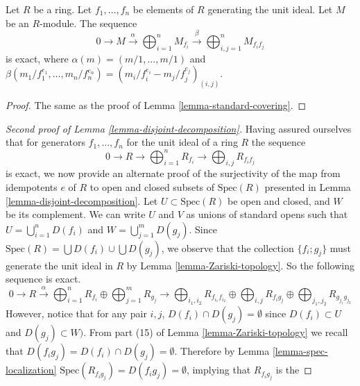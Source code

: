 \begin{lemma}
\label{lemma-cover-module}
Let $R$ be a ring. Let $f_1, \ldots, f_n$ be elements of $R$
generating the unit ideal. Let $M$ be an $R$-module.
The sequence
$$
0 \to
M \xrightarrow{\alpha}
\bigoplus\nolimits_{i = 1}^n M_{f_i} \xrightarrow{\beta}
\bigoplus\nolimits_{i, j = 1}^n M_{f_i f_j}
$$
is exact, where $\alpha(m) = (m/1, \ldots, m/1)$
and $\beta(m_1/f_1^{e_1}, \ldots, m_n/f_n^{e_n})
= (m_i/f_i^{e_i} - m_j/f_j^{e_j})_{(i, j)}$.
\end{lemma}

\begin{proof}
The same as the proof of Lemma \ref{lemma-standard-covering}.
\end{proof}

\begin{proof}[Second proof of Lemma \ref{lemma-disjoint-decomposition}]
Having assured ourselves that for generators ${f_1, \ldots, f_n}$ for the unit
ideal of a ring $R$ the sequence
$$
0 \rightarrow R
\rightarrow \bigoplus\nolimits_{i = 1}^ {n} R_{f_{i}}
\rightarrow \bigoplus\nolimits_{i, j} R_{f_{i}f_{j}}
$$
is exact, we now provide an alternate proof of the surjectivity of
the map from idempotents $e$ of $R$ to open and closed subsets of
$\text{Spec}(R)$
presented in Lemma \ref{lemma-disjoint-decomposition}.
Let $U \subset \text{Spec}(R)$ be open and closed, and $W$ be its
complement. We can
write $U$ and $V$ as unions of standard opens such that
$U = \bigcup_{i = 1}^{n}  D(f_i)$ and
$W = \bigcup_{j = 1}^{m} D(g_j)$.  Since
$\text{Spec}(R) = \bigcup D(f_i) \cup \bigcup D(g_j)$,
we observe that the collection $\{ f_i;g_j\}$ must
generate the unit ideal in $R$ by Lemma \ref{lemma-Zariski-topology}.
So the following sequence is exact.
\begin{equation}
\label{equation-idempotent-exact-sequence}
0 \rightarrow R \stackrel{\alpha}{\rightarrow}
\bigoplus\nolimits_{i = 1}^ {n} R_{f_{i}}
\oplus \bigoplus\nolimits_{j = 1}^{m} R_{g_j}
\rightarrow
\bigoplus\nolimits_{i_1, i_2} R_{f_{i_1}f_{i_2}}
\oplus \bigoplus\nolimits_{i, j} R_{f_{i}g_{j}}
\oplus \bigoplus\nolimits_{j_1, j_2} R_{g_{j_1}g_{j_2}}
\end{equation}
However, notice that for any pair $i, j$,
$D(f_i) \cap D(g_j) = \emptyset$
since $D(f_i) \subset U$ and $D(g_j) \subset W)$. From part (15)
of Lemma \ref{lemma-Zariski-topology}
we recall that $D(f_i g_j) = D(f_i) \cap D(g_j) = \emptyset$. Therefore by
Lemma \ref{lemma-spec-localization}
$\text{Spec}(R_{f_i g_j}) = D(f_i g_j) = \emptyset$,
implying that $R_{f_i g_j}$ is the

\end{proof}
